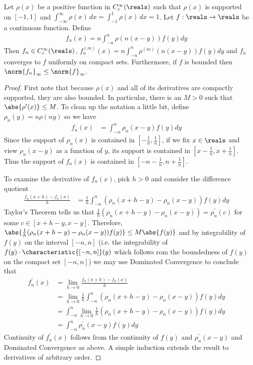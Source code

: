 \begin{lem}\label{ApproximationByMollifiers}Let $\rho(x)$ be a positive
  function in $C^\infty_c(\reals)$ such
  that $\rho(x)$ is supported on $[-1,1]$ and $\int_{-\infty}^\infty
  \rho(x) \, dx = \int_{-1}^1
  \rho(x) \, dx= 1$.  Let $f : \reals \to \reals$ be a continuous function.  Define 
\begin{align*}
f_n(x) = n \int_{-n}^n \rho(n(x - y)) f(y) dy
\end{align*}
Then $f_n \in C_c^\infty(\reals)$, $f_n^{(m)}(x) = n \int_{-n}^n
\rho^{(m)}(n(x -y)) f(y) dy$ and $f_n$ converges to $f$ uniformly on
compact sets.  Furthermore, if $f$ is bounded then $\norm{f_n}_\infty \leq
\norm{f}_\infty$.
\end{lem}
\begin{proof}
First note that because $\rho(x)$ and all of its derivatives are
compactly supported, they are also bounded.  In particular, there is
an $M > 0$ such that $\abs{\rho^\prime(x)} \leq M$.  To clean up the notation
a little bit, define $\rho_n(y) = n\rho(ny)$ so we have
\begin{align*}
f_n(x) &= \int_{-n}^{n} \rho_n(x - y) f(y) dy
\end{align*}
Since the support of $\rho_n(x)$ is contained in
$[-\frac{1}{n},\frac{1}{n}]$, if we fix $x \in \reals$ and
view $\rho_n(x - y)$ as a  function of $y$, its support is
contained in $[x-\frac{1}{n},x+\frac{1}{n}]$.  Thus the support of
$f_n(x)$ is contained in  $[-n-\frac{1}{n},n+\frac{1}{n}]$.

To examine the derivative
of $f_n(x)$, pick $h > 0$ and consider the difference
quotient
\begin{align*}
\frac{f_n(x + h) - f_n(x)}{h} &= \frac{1}{h} \int_{-n}^{n}
(\rho_n(x+h - y) - \rho_n(x - y) ) f(y) dy
\end{align*}
Taylor's Theorem tells us that $\frac{1}{h}(\rho_n(x+h - y) - \rho_n(x - y)) =
\rho_n^\prime(c)$ for some $c \in [x+h - y, x - y]$.  Therefore,
$\abs{\frac{1}{h} (\rho_n(x+h - y) - \rho_n(x - y))f(y)} \leq M\abs{f(y)}$ and by
integrability of $f(y)$ on the interval $[-n,n]$ (i.e. the
integrability of $f(y) \cdot \characteristic{[-n,n]}(y)$ which follows
rom the boundedness of $f(y)$ on the compact set $[-n,n]$) we may use Dominated Convergence to conclude
that 
\begin{align*}
f_n^\prime(x) &=\lim_{h \to 0} \frac{f_n(x + h) - f_n(x)}{h} \\
&= \lim_{h \to 0} \frac{1}{h} \int_{-n}^{n}
(\rho_n(x+h - y) - \rho_n(x - y) ) f(y) dy \\
&= \int_{-n}^{n }
\lim_{h \to 0} \frac{1}{h} (\rho_n(x+h - y) - \rho_n(x - y) ) f(y) dy
\\
&= \int_{-n}^{n} \rho^\prime_n(x - y) f(y) dy 
\end{align*} 
Continuity of $f_n^\prime(x)$ follows from the continuity of $f(y)$
and $\rho^\prime_n(x - y) $ and Dominated Convergence as above.  A simple induction extends the result to derivatives of arbitrary
order.


\end{proof}
